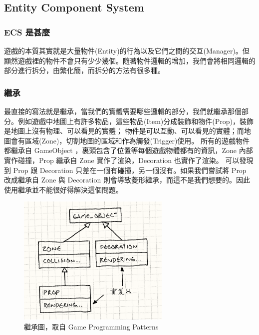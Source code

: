 \subsection{Entity Component System} %
\label{sub:Entity Component System}

\subsubsection{ECS 是甚麼}
遊戲的本質其實就是大量物件(Entity)的行為以及它們之間的交互(Manager)。但顯然遊戲裡的物件不會只有少少幾個。隨著物件邏輯的增加，我們會將相同邏輯的部分進行拆分，由繁化簡，而拆分的方法有很多種。

\subsubsection{繼承}

最直接的寫法就是繼承，當我們的實體需要哪些邏輯的部分，我們就繼承那個部分。例如遊戲中地圖上有許多物品，這些物品(Item)分成裝飾和物件(Prop)，裝飾是地圖上沒有物理、可以看見的實體；
物件是可以互動、可以看見的實體；而地圖會有區域(Zone)，切割地圖的區域和作為觸發(Trigger)使用。
所有的遊戲物件都繼承自 GameObject ，裏頭包含了位置等每個遊戲物體都有的資訊，Zone 內部實作碰撞，Prop 繼承自 Zone 實作了渲染，Decoration 也實作了渲染。
可以發現到 Prop 跟 Decoration 只差在一個有碰撞，另一個沒有。如果我們嘗試將 Prop 改成繼承自 Zone 與 Decoration 則會導致菱形繼承，而這不是我們想要的。因此使用繼承並不能很好得解決這個問題。

\begin{figure}[h]
    \begin{center}
        \includegraphics[width=0.65\textwidth]{./resources/ecs/inherit.png}
    \end{center}
\caption{繼承圖，取自 Game Programming Patterns}
\label{fig:inherit}
\end{figure}

